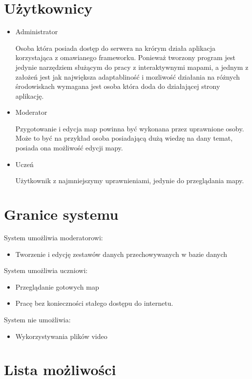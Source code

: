 \section{Użytkownicy}
\label{sec:uzytkownicy}

\begin{itemize}
\item
Administrator

Osoba która posiada dostęp do serwera na krórym działa aplikacja korzystająca z omawianego frameworku. Ponieważ tworzony program jest jedynie narzędziem służącym do pracy z interaktywnymi mapami, a jednym z założeń jest jak największa adaptabliność i mozliwość działania na różnych środowiskach wymagana jest osoba która doda do działającej strony aplikację.
\item
Moderator

Pzygotowanie i edycja map powinna być wykonana przez uprawnione osoby. Może to być na przykład osoba posiadającą dużą wiedzę na dany temat, posiada ona możliwość edycji mapy.
\item
Uczeń

Użytkownik z najmniejszymy uprawnieniami, jedynie do przeglądania mapy.
\end{itemize}

\section{Granice systemu}
\label{sec:granicesystemu}

System umożliwia moderatorowi:
\begin{itemize}
\item
Tworzenie i edycję zestawów danych przechowywanych w bazie danych 

\end{itemize}

System umożliwia uczniowi:
\begin{itemize}
\item
Przeglądanie gotowych map

\item
Pracę bez konieczności stałego dostępu do internetu.
\end{itemize}

System nie umożliwia:
\begin{itemize}
\item
Wykorzystywania plików video

\end{itemize}

\section{Lista możliwości}
\label{sec:listamozliwosci}

